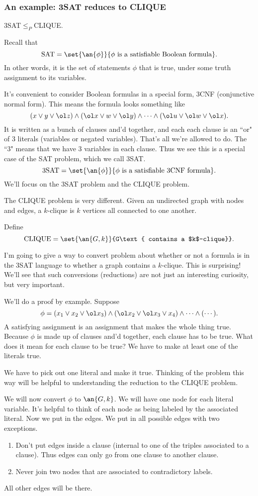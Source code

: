\subsubsection{An example: 3SAT reduces to CLIQUE}
\begin{ex}
3SAT$\le_P$CLIQUE.

Recall that
\[
\text{SAT}=\set{\an{\phi}}{\phi\text{ is a satisfiable Boolean formula}}.
\]
In other words, it is the set of statements $\phi$ that is true, under some truth assignment to its variables. 

It's convenient to consider Boolean formulas in a special form, 3CNF (conjunctive normal form). This means the formula looks something like
\[
(x\vee y\vee \ol z)\wedge (\ol x\vee w\vee \ol y)\wedge \cdots \wedge (\ol u\vee \ol w\vee \ol x).
\]
It is written as a bunch of clauses and'd together, and each each clause is an ``or" of 3 literals (variables or negated variables). That's all we're allowed to do. The ``3" means that we have 3 variables in each clause. 
Thus we see this is a special case of the SAT problem, which we call 3SAT.
\[
\text{3SAT}=
\set{\an{\phi}}{\phi\text{ is a satisfiable 3CNF formula}}.
\]
We'll focus on the 3SAT problem and the CLIQUE problem.

The CLIQUE problem is very different. Given an undirected graph with nodes and edges, a $k$-clique is $k$ vertices all connected to one another.


Define
\[
\text{CLIQUE}=\set{\an{G,k}}{G\text{ contains a $k$--clique}}.
\]

I'm going to give a way to convert problem about whether or not a formula is in the 3SAT language to whether a graph contains a $k$-clique. This is surprising!
We'll see that such conversions (reductions) are not just an interesting curiosity, but very important.

We'll do a proof by example. Suppose
\[
\phi=(x_1\vee x_2\vee \ol x_3)\wedge (\ol x_2\vee \ol x_3\vee x_4)\wedge\cdots \wedge (\cdots).
\]
A satisfying assignment is an assignment that makes the whole thing true. Because $\phi$ is made up of clauses and'd together, each clause has to be true.  What does it mean for each clause to be true? We have to make at least one of the literals true. 

We have to pick out one literal and make it true. Thinking of the problem this way will be helpful to understanding the reduction to the CLIQUE problem.

We will now convert $\phi$ to $\an{G,k}$. %
We will have one node for each literal variable. It's helpful to think of each node as being labeled by the associated literal. Now we put in the edges. We put in all possible edges with two exceptions.
\begin{enumerate}
\item
Don't put edges inside a clause (internal to one of the triples associated to a clause). Thus edges can only go from one clause to another clause.
\item
Never join two nodes that are associated to contradictory labels. 
\end{enumerate}
All other edges will be there. 


\end{ex}
